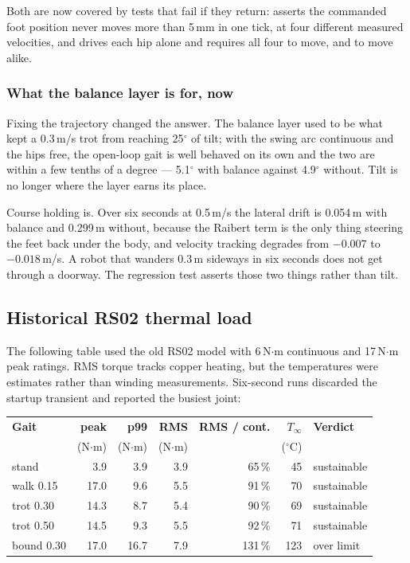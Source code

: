 \documentclass[11pt,a4paper]{article}
\begin{document}
Both are now covered by tests that fail if they return:
 asserts the commanded foot
position never moves more than 5\,mm in one tick, at four different measured
velocities, and
 drives each
hip alone and requires all four to move, and to move alike.

\subsubsection{What the balance layer is for, now}

Fixing the trajectory changed the answer. The balance layer used to be what
kept a 0.3\,m/s trot from reaching 25$^\circ$ of tilt; with the swing arc
continuous and the hips free, the open-loop gait is well behaved on its own and
the two are within a few tenths of a degree --- 5.1$^\circ$ with balance
against 4.9$^\circ$ without. Tilt is no longer where the layer earns its place.

Course holding is. Over six seconds at 0.5\,m/s the lateral drift is 0.054\,m
with balance and 0.299\,m without, because the Raibert term is the only thing
steering the feet back under the body, and velocity tracking degrades from
$-0.007$ to $-0.018$\,m/s. A robot that wanders 0.3\,m sideways in six seconds
does not get through a doorway. The regression test asserts those two things
rather than tilt.

\subsection{Historical RS02 thermal load}
\label{sec:thermal-load}

The following table used the old RS02 model with 6\,N$\cdot$m continuous
and 17\,N$\cdot$m peak ratings. RMS torque tracks copper heating, but the
temperatures were estimates rather than winding measurements. Six-second runs
discarded the startup transient and reported the busiest joint:

\begin{center}\small
\begin{tabular}{@{}lrrrrrl@{}}
\toprule
\textbf{Gait} & \textbf{peak} & \textbf{p99} & \textbf{RMS} &
\textbf{RMS / cont.} & \textbf{$T_\infty$} & \textbf{Verdict} \\
 & (N$\cdot$m) & (N$\cdot$m) & (N$\cdot$m) & & ($^\circ$C) & \\
\midrule
stand         &  3.9 &  3.9 &  3.9 &  65\,\% &  45 & sustainable \\
walk 0.15     & 17.0 &  9.6 &  5.5 &  91\,\% &  70 & sustainable \\
trot 0.30     & 14.3 &  8.7 &  5.4 &  90\,\% &  69 & sustainable \\
trot 0.50     & 14.5 &  9.3 &  5.5 &  92\,\% &  71 & sustainable \\
bound 0.30    & 17.0 & 16.7 &  7.9 & 131\,\% & 123 & over limit \\
\bottomrule
\end{tabular}
\end{center}
\end{document}
